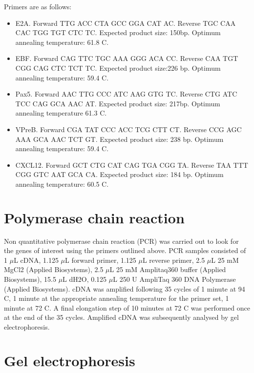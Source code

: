 Primers are as follows:
\begin{itemize}
\item E2A. Forward TTG ACC CTA GCC GGA CAT AC.
Reverse TGC CAA CAC TGG TGT CTC TC.
Expected product size: 150bp.
Optimum annealing temperature: 61.8 \textdegree C.

\item EBF.
Forward CAG TTC TGC AAA GGG ACA CC.
Reverse CAA TGT CGG CAG CTC TCT TC.
Expected product size:226 bp.
Optimum annealing temperature: 59.4 \textdegree C.

\item Pax5. Forward AAC TTG CCC ATC AAG GTG TC.
Reverse CTG ATC TCC CAG GCA AAC AT.
Expected product size: 217bp.
Optimum annealing temperature 61.3 \textdegree C.

\item VPreB.
Forward CGA TAT CCC ACC TCG CTT CT.
Reverse CCG AGC AAA GCA AAC TCT GT.
Expected product size: 238 bp.
Optimum annealing temperature: 59.4 \textdegree C.

\item CXCL12.
Forward GCT CTG CAT CAG TGA CGG TA.
Reverse TAA TTT CGG GTC AAT GCA CA.
Expected product size: 184 bp.
Optimum annealing temperature: 60.5 \textdegree C.
\end{itemize}

\section{Polymerase chain reaction}

Non quantitative polymerase chain reaction (PCR) was carried out to look for the genes of interest using the primers outlined above.
PCR samples consisted of 1 $\mu$L cDNA, 1.125 $\mu$L forward primer, 1.125 $\mu$L reverse primer, 2.5 $\mu$L 25 mM MgCl{2} (Applied Biosystems), 2.5 $\mu$L 25 mM Amplitaq360 buffer (Applied Biosystems), 15.5 $\mu$L dH{2}O, 0.125 $\mu$L 250 U AmpliTaq 360 DNA Polymerase (Applied Biosystems).
cDNA was amplified following 35 cycles of 1 minute at 94 \textdegree C, 1 minute at the appropriate annealing temperature for the primer set, 1 minute at 72 \textdegree C. 
A final elongation step of 10 minutes at 72 \textdegree C was performed once at the end of the 35 cycles.
Amplified cDNA was subsequently analysed by gel electrophoresis.

\section{Gel electrophoresis}

